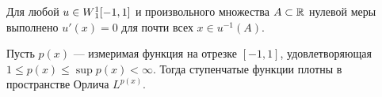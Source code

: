 \begin{prop}
\label{prop:level_derivative}
\textrm{\cite[теорема 6.19]{LiebLoss} }
Для любой $u \in W{}_1^1[-1, 1]$ и произвольного множества $A \subset \mathbb R$ нулевой меры выполнено
$u'(x) = 0$ для почти всех $x \in u^{-1}(A)$.
\end{prop}

\begin{prop}
\label{prop:step_dense_orlicz}
Пусть $p(x)$ --- измеримая функция на отрезке $[-1, 1]$, удовлетворяющая
$1 \le p(x) \le \sup p(x) < \infty$.
Тогда ступенчатые функции плотны в пространстве Орлича $L^{p(x)}$.
\end{prop}
